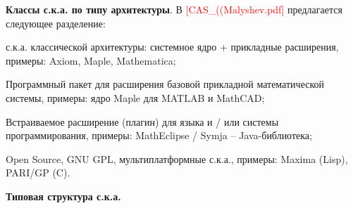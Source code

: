 \textbf{Классы с.к.а. по типу архитектуры}. В \textcolor{red}{[CAS\_((Malyshev.pdf]} предлагается следующее разделение: 
\begin{textitemize}
	\item с.к.а. классической 
	архитектуры: системное ядро + прикладные расширения, примеры:
	Axiom, Maple, Mathematica;
	\item Программный пакет для расширения базовой прикладной математической системы, примеры: ядро Maple для MATLAB и MathCAD;
	\item Встраиваемое расширение (плагин) для языка и / или системы программирования, примеры: MathEclipse / Symja 
	-- Java-библиотека;
	\item Open Source, GNU GPL, мультиплатформные с.к.а., примеры: Maxima (Lisp), PARI/GP (C).
\end{textitemize}

\textbf{Типовая структура с.к.а.}

